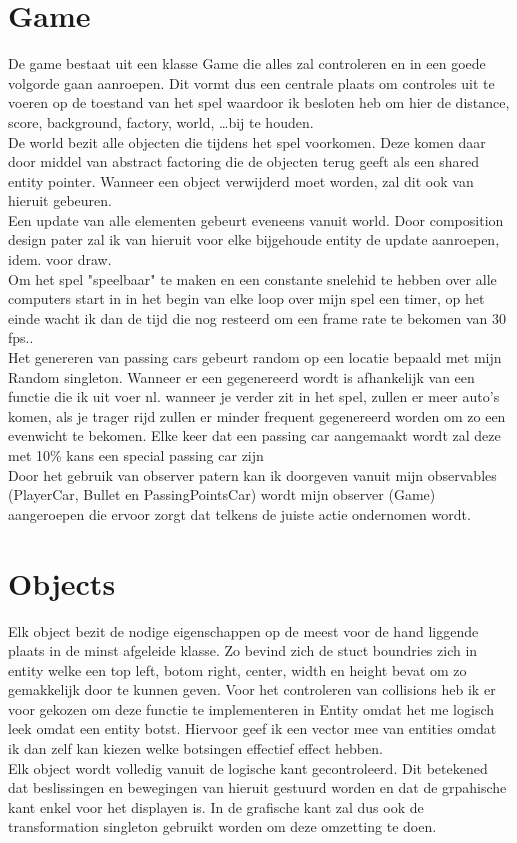 \documentclass[12pt,a4paper]{article}
\begin{document}
\section{Game}
De game bestaat uit een klasse Game die alles zal controleren en in een goede volgorde gaan aanroepen. Dit vormt dus een centrale plaats om controles uit te voeren op de toestand van het spel waardoor ik besloten heb om hier de distance, score, background, factory, world, \ldots bij te houden.\\
De world bezit alle objecten die tijdens het spel voorkomen. Deze komen daar door middel van abstract factoring die de objecten terug geeft als een shared entity pointer. Wanneer een object verwijderd moet worden, zal dit ook van hieruit gebeuren.\\
Een update van alle elementen gebeurt eveneens vanuit world. Door composition design pater zal ik van hieruit voor elke bijgehoude entity de update aanroepen, idem. voor draw.\\
\linebreak
Om het spel "speelbaar" te maken en een constante snelehid te hebben over alle computers start in in het begin van elke loop over mijn spel een timer, op het einde wacht ik dan de tijd die nog resteerd om een frame rate te bekomen van 30 fps..\\
Het genereren van passing cars gebeurt random op een locatie bepaald met mijn Random singleton. Wanneer er een gegenereerd wordt is afhankelijk van een functie die ik uit voer nl. wanneer je verder zit in het spel, zullen er meer auto's komen, als je trager rijd zullen er minder frequent gegenereerd worden om zo een evenwicht te bekomen. Elke keer dat een passing car aangemaakt wordt zal deze met 10\% kans een special passing car zijn\\
\linebreak
Door het gebruik van observer patern kan ik doorgeven vanuit mijn observables (PlayerCar, Bullet en PassingPointsCar) wordt mijn observer (Game) aangeroepen die ervoor zorgt dat telkens de juiste actie ondernomen wordt.
\newpage

\section{Objects}
Elk object bezit de nodige eigenschappen op de meest voor de hand liggende plaats in de minst afgeleide klasse. Zo bevind zich de stuct boundries zich in entity welke een top left, botom right, center, width en height bevat om zo gemakkelijk door te kunnen geven. Voor het controleren van collisions heb ik er voor gekozen om deze functie te implementeren in Entity omdat het me logisch leek omdat een entity botst. Hiervoor geef ik een vector mee van entities omdat ik dan zelf kan kiezen welke botsingen effectief effect hebben.\\
Elk object wordt volledig vanuit de logische kant gecontroleerd. Dit betekened dat beslissingen en bewegingen van hieruit gestuurd worden en dat de grpahische kant enkel voor het displayen is. In de grafische kant zal dus ook de transformation singleton gebruikt worden om deze omzetting te doen.
\end{document}
